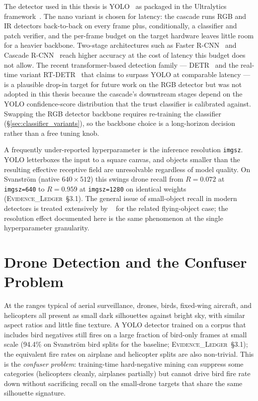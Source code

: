 \documentclass[12pt,a4paper,oneside,openright]{book}
\begin{document}
The detector used in this thesis is YOLO~\cite{redmon2016yolo} as packaged in the Ultralytics framework~\cite{ultralytics2024}. The nano variant is chosen for latency: the cascade runs RGB and IR detectors back-to-back on every frame plus, conditionally, a classifier and patch verifier, and the per-frame budget on the target hardware leaves little room for a heavier backbone. Two-stage architectures such as Faster R-CNN~\cite{ren2015fasterrcnn} and Cascade R-CNN~\cite{cai2018cascade} reach higher accuracy at the cost of latency this budget does not allow. The recent transformer-based detection family --- DETR~\cite{carion2020detr} and the real-time variant RT-DETR~\cite{zhao2024rtdetr} that claims to surpass YOLO at comparable latency --- is a plausible drop-in target for future work on the RGB detector but was not adopted in this thesis because the cascade's downstream stages depend on the YOLO confidence-score distribution that the trust classifier is calibrated against. Swapping the RGB detector backbone requires re-training the classifier (\S\ref{sec:classifier_variants}), so the backbone choice is a long-horizon decision rather than a free tuning knob.

A frequently under-reported hyperparameter is the inference resolution \texttt{imgsz}. YOLO letterboxes the input to a square canvas, and objects smaller than the resulting effective receptive field are unresolvable regardless of model quality. On Svanstr\"om (native $640\times512$) this swings drone recall from $R=0.072$ at \texttt{imgsz=640} to $R=0.959$ at \texttt{imgsz=1280} on identical weights (\textsc{Evidence\_Ledger}~\S3.1). The general issue of small-object recall in modern detectors is treated extensively by \citeauthor{rozantsev2017detecting}~\cite{rozantsev2017detecting} for the related flying-object case; the resolution effect documented here is the same phenomenon at the single hyperparameter granularity.

\section{Drone Detection and the Confuser Problem}
\label{sec:lit_drone}

At the ranges typical of aerial surveillance, drones, birds, fixed-wing aircraft, and helicopters all present as small dark silhouettes against bright sky, with similar aspect ratios and little fine texture. A YOLO detector trained on a corpus that includes bird negatives still fires on a large fraction of bird-only frames at small scale (94.4\% on Svanstr\"om bird splits for the baseline; \textsc{Evidence\_Ledger}~\S3.1); the equivalent fire rates on airplane and helicopter splits are also non-trivial. This is the \emph{confuser problem}: training-time hard-negative mining can suppress some categories (helicopters cleanly, airplanes partially) but cannot drive bird fire rate down without sacrificing recall on the small-drone targets that share the same silhouette signature.
\end{document}
